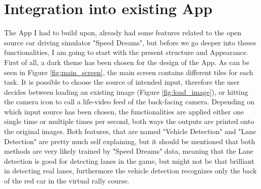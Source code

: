 
\chapter{Integration into existing App}\label{chapter:Integration into existing App}


The App I had to build upon, already had some features related to the open source car driving simulator "Speed Dreams", but before we go deeper into theses functionalities, I am going to start with the present structure and Appearance.
First of all, a dark theme has been chosen for the design of the App. As can be seen in Figure \ref{fig:main_screen}, the main screen contains different tiles for each task. It is possible to choose the source of intended input, therefore the user decides between loading an existing image (Figure \ref{fig:load_image}), or hitting the camera icon to call a life-video feed of the back-facing camera. Depending on which input source has been chosen, the functionalities are applied either one single time or multiple times per second, both ways the outputs are printed onto the original images. Both features, that are named "Vehicle Detection" and "Lane Detection" are pretty much self explaining, but it should be mentioned that both methods are very likely trained by "Speed Dreams" data, meaning that the Lane detection is good for detecting lanes in the game, but might not be that brilliant in detecting real lanes, furthermore the vehicle detection recognizes only the back of the red car in the virtual rally course. 


